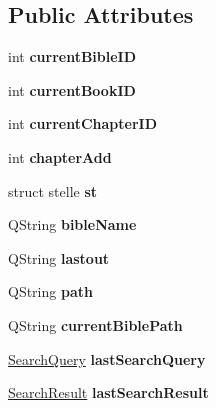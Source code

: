 \subsection*{Public Attributes}
\begin{CompactItemize}
\item 
\hypertarget{classBible_9501c28fb96b1c64e8180fd55540c4f8}{
int \textbf{currentBibleID}}
\label{classBible_9501c28fb96b1c64e8180fd55540c4f8}

\item 
\hypertarget{classBible_ad30964241716172af1baa5610f7be3a}{
int \textbf{currentBookID}}
\label{classBible_ad30964241716172af1baa5610f7be3a}

\item 
\hypertarget{classBible_e2db5bfeb962540545620020c4df62c1}{
int \textbf{currentChapterID}}
\label{classBible_e2db5bfeb962540545620020c4df62c1}

\item 
\hypertarget{classBible_6044495c9fb228455b6f4e295a2802e0}{
int \textbf{chapterAdd}}
\label{classBible_6044495c9fb228455b6f4e295a2802e0}

\item 
\hypertarget{classBible_05108f885ee17a2b574d96e3fbb23b33}{
struct stelle \textbf{st}}
\label{classBible_05108f885ee17a2b574d96e3fbb23b33}

\item 
\hypertarget{classBible_99e0cb6707bad5e1a25d2d360e3f3c1d}{
QString \textbf{bibleName}}
\label{classBible_99e0cb6707bad5e1a25d2d360e3f3c1d}

\item 
\hypertarget{classBible_abb92e73cdb26638d40325e5d708ec7b}{
QString \textbf{lastout}}
\label{classBible_abb92e73cdb26638d40325e5d708ec7b}

\item 
\hypertarget{classBible_2395ae3cf6893dc3888b82dc799d11d1}{
QString \textbf{path}}
\label{classBible_2395ae3cf6893dc3888b82dc799d11d1}

\item 
\hypertarget{classBible_de80d35d802a574b91fdf13be4b35e81}{
QString \textbf{currentBiblePath}}
\label{classBible_de80d35d802a574b91fdf13be4b35e81}

\item 
\hypertarget{classBible_1b406912e4d01a4e4755b17a6b2b3893}{
\hyperlink{classSearchQuery}{SearchQuery} \textbf{lastSearchQuery}}
\label{classBible_1b406912e4d01a4e4755b17a6b2b3893}

\item 
\hypertarget{classBible_62899d799a8c6efcf5283808edb205a7}{
\hyperlink{classSearchResult}{SearchResult} \textbf{lastSearchResult}}
\label{classBible_62899d799a8c6efcf5283808edb205a7}


\end{CompactItemize}
